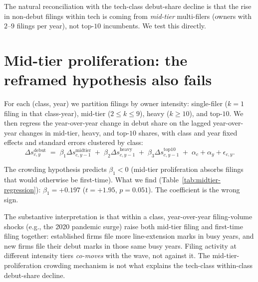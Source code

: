 \documentclass[11pt]{article}
\begin{document}
The natural reconciliation with the tech-class debut-share decline
is that the rise in non-debut filings within tech is coming from
\emph{mid-tier} multi-filers (owners with $2$--$9$ filings per year),
not top-$10$ incumbents. We test this directly.

\section{Mid-tier proliferation: the reframed hypothesis also fails}
\label{sec:midtier}

For each (class, year) we partition filings by owner intensity:
single-filer ($k = 1$ filing in that class-year), mid-tier
($2 \le k \le 9$), heavy ($k \ge 10$), and top-$10$. We then
regress the year-over-year change in debut share on the lagged
year-over-year changes in mid-tier, heavy, and top-$10$ shares,
with class and year fixed effects and standard errors clustered by
class:
$$\Delta s_{c,y}^{\text{debut}} \;=\; \beta_1 \Delta s_{c,y-1}^{\text{midtier}}
   \;+\; \beta_2 \Delta s_{c,y-1}^{\text{heavy}}
   \;+\; \beta_3 \Delta s_{c,y-1}^{\text{top10}}
   \;+\; \alpha_c + \alpha_y + \epsilon_{c,y}.$$

The crowding hypothesis predicts $\beta_1 < 0$ (mid-tier proliferation
absorbs filings that would otherwise be first-time). What we find
(Table~\ref{tab:midtier-regression}): $\beta_1 = +0.197$
($t = +1.95$, $p = 0.051$). The coefficient is the wrong sign.

\begin{table}[h]
\centering
\small

\caption{Within-class panel regression of $\Delta$debut share on
lagged $\Delta$multi-filer shares. All three coefficients are
positive --- the within-class year-over-year predictors all
co-move with debut share, not against it. Cluster-by-class
standard errors. $N = 1{,}755$ (class $\times$ year) cells.}
\label{tab:midtier-regression}
\end{table}

The substantive interpretation is that within a class, year-over-year
filing-volume shocks (e.g., the 2020 pandemic surge) raise both
mid-tier filing and first-time filing together: established firms
file more line-extension marks in busy years, and new firms file
their debut marks in those same busy years. Filing activity at
different intensity tiers \emph{co-moves} with the wave, not against
it. The mid-tier-proliferation crowding mechanism is not what
explains the tech-class within-class debut-share decline.
\end{document}
